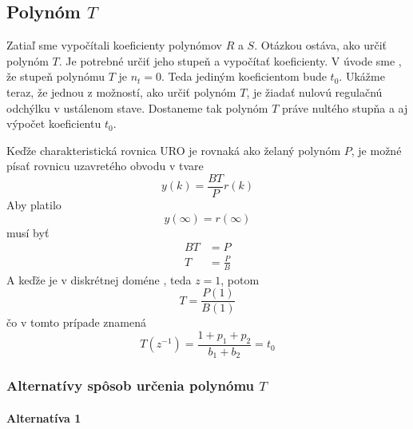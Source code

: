 \documentclass[a4paper, 10pt, ]{article}
\begin{document}
\subsection{Polynóm $T$}

\bigskip

Zatiaľ sme vypočítali koeficienty polynómov $R$ a $S$. Otázkou ostáva, ako určiť polynóm $T$. Je potrebné určiť jeho stupeň a vypočítať koeficienty. V úvode sme , že stupeň polynómu $T$ je $n_t = 0$. Teda jediným koeficientom bude $t_0$. Ukážme teraz, že jednou z možností, ako určiť polynóm $T$, je žiadať nulovú regulačnú odchýlku v ustálenom stave. Dostaneme tak polynóm $T$ práve nultého stupňa a aj výpočet koeficientu $t_0$.

Keďže charakteristická rovnica URO je rovnaká ako želaný polynóm $P$, je možné písať rovnicu uzavretého obvodu v tvare
\begin{equation}
	y(k) = \frac{BT}{P} r(k)
\end{equation}
Aby platilo
\begin{equation}
	y(\infty) = r(\infty)
\end{equation}
musí byť
\begin{subequations}
	\begin{align}
		BT &= P \\
		T &= \frac{P}{B}
	\end{align}
\end{subequations}
A keďže  je v diskrétnej doméne , teda $z = 1$, potom
\begin{equation}
	T = \frac{P(1)}{B(1)}
\end{equation}
čo v tomto prípade znamená
\begin{equation}
	T(z^{-1}) = \frac{1 + p_1 + p_2}{b_1 + b_2} = t_0
\end{equation}





\subsubsection{Alternatívy spôsob určenia polynómu $T$}

\paragraph{Alternatíva 1}
\end{document}
